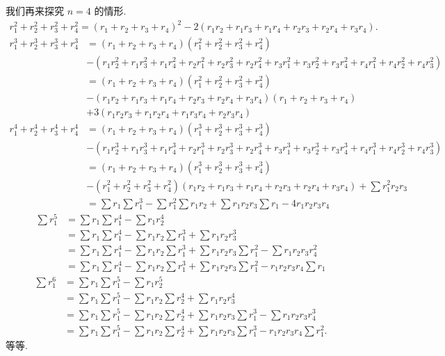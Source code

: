 \documentclass[twoside,11pt]{article} \usepackage{amsmath,amsfonts,bm}
\begin{document}
我们再来探究 $n=4$ 的情形.
\begin{align*}
  r_1^{2}+r_2^{2}+r_3^{2}+r_4^2=(r_1+r_2+r_3+r_4)^2-2(r_1r_2+r_1r_3+r_1r_4+r_2r_3+r_2r_4+r_3r_4).
\end{align*}
\begin{align*}
  r_1^3+r_2^3+r_3^3+r_4^3&=(r_1+r_2+r_3+r_4)(r_1^2+r_2^2+r_3^2+r_4^2)\\&-(r_1r_2^2+r_1r_3^2+r_1r_4^2+r_2r_1^2+r_2r_3^2+r_2r_4^2+r_3r_1^2+r_3r_2^2+r_3r_4^2+r_4r_1^2+r_4r_2^2+r_4r_3^2)\\&=(r_1+r_2+r_3+r_4)(r_1^2+r_2^2+r_3^2+r_4^2)\\&-(r_1r_2+r_1r_3+r_1r_4+r_2r_3+r_2r_4+r_3r_4)(r_1+r_2+r_3+r_4)\\&+3(r_1r_2r_3+r_1r_2r_4+r_1r_3r_4+r_2r_3r_4)
\end{align*}
\begin{align*}
  r_1^4+r_2^4+r_3^4+r_4^4&=(r_1+r_2+r_3+r_4)(r_1^3+r_2^3+r_3^3+r_4^3)\\&-(r_1r_2^3+r_1r_3^3+r_1r_4^3+r_2r_1^3+r_2r_3^3+r_2r_4^3+r_3r_1^3+r_3r_2^3+r_3r_4^3+r_4r_1^3+r_4r_2^3+r_4r_3^3)\\&=(r_1+r_2+r_3+r_4)(r_1^3+r_2^3+r_3^3+r_4^3)\\&-(r_1^2+r_2^2+r_3^2+r_4^2)(r_1r_2+r_1r_3+r_1r_4+r_2r_3+r_2r_4+r_3r_4)+\sum
  r_1^2r_2r_3\\&=\sum r_1\sum r_1^3-\sum r_1^2\sum r_1r_2+\sum
  r_1r_2r_3\sum r_1-4r_1r_2r_3r_4
\end{align*}
\begin{align*}
  \sum r_1^5&=\sum r_1\sum r_1^4-\sum r_1r_2^4\\&=\sum r_1\sum
  r_1^4-\sum r_1r_2\sum r_1^3+\sum r_1r_2r_3^3\\&=\sum r_1\sum
  r_1^4-\sum r_1r_2\sum r_1^3+\sum r_1r_2r_3\sum r_1^2-\sum
  r_1r_2r_3r_4^2\\&=\sum r_1\sum r_1^4-\sum r_1r_2\sum r_1^3+\sum
  r_1r_2r_3\sum r_1^2-r_1r_2r_3r_4\sum r_1
\end{align*}
\begin{align*}
  \sum r_1^6&=\sum r_1\sum r_1^5-\sum r_1r_2^5\\&=\sum r_1\sum
  r_1^5-\sum r_1r_2\sum r_2^4+\sum r_1r_2r_3^4\\&=\sum r_1\sum
  r_1^5-\sum r_1r_2\sum r_2^4+\sum r_1r_2r_3\sum r_1^3-\sum
  r_1r_2r_3r_4^3\\&=\sum r_1\sum r_1^5-\sum r_1r_2\sum r_2^4+\sum
  r_1r_2r_3\sum r_1^3-r_1r_2r_3r_4\sum r_1^2.
\end{align*}
等等.
\iffalse
\end{document}
